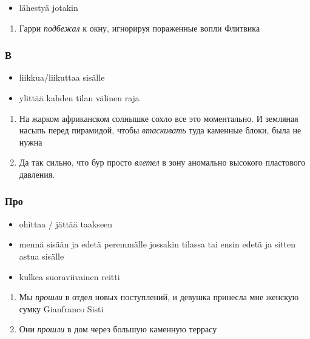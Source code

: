 \documentclass[]{scrartcl}
\providecommand{\tightlist}{%
  \setlength{\itemsep}{0pt}\setlength{\parskip}{0pt}}
\begin{document}
\begin{itemize}
\tightlist
\item
  lähestyä jotakin
\end{itemize}

\begin{enumerate}
\def\labelenumi{(\arabic{enumi})}
\setcounter{enumi}{428}
\tightlist
\item
  Гарри \emph{подбежал} к окну, игнорируя пораженные вопли Флитвика
\end{enumerate}

\subsubsection{В}\label{ux432}

\begin{itemize}
\tightlist
\item
  liikkua/liikuttaa sisälle
\item
  ylittää kahden tilan välinen raja
\end{itemize}

\begin{enumerate}
\def\labelenumi{(\arabic{enumi})}
\setcounter{enumi}{429}
\tightlist
\item
  На жарком африканском солнышке сохло все это моментально. И земляная
  насыпь перед пирамидой, чтобы \emph{втаскивать} туда каменные блоки,
  была не нужна
\item
  Да так сильно, что бур просто \emph{влетел} в зону аномально высокого
  пластового давления.
\end{enumerate}

\subsubsection{Про}\label{ux43fux440ux43e}

\begin{itemize}
\tightlist
\item
  ohittaa / jättää taakseen
\item
  mennä sisään ja edetä peremmälle jossakin tilassa tai ensin edetä ja
  sitten astua sisälle
\item
  kulkea suoraviivainen reitti
\end{itemize}

\begin{enumerate}
\def\labelenumi{(\arabic{enumi})}
\setcounter{enumi}{431}
\tightlist
\item
  Мы \emph{прошли} в отдел новых поступлений, и девушка принесла мне
  женскую сумку Gianfranco Sisti
\item
  Они \emph{прошли} в дом через большую каменную террасу
\end{enumerate}
\end{document}
